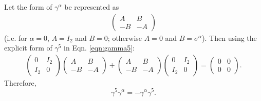 \label{ssc:gamma5Anticommutator}

Let the form of $\gamma^\alpha$ be represented as
\begin{align*}
\begin{pmatrix}
A & B\\
-B & -A
\end{pmatrix}
\end{align*}
(i.e. for $\alpha=0$, $A=I_2$ and $B=0$; otherwise $A=0$ and $B=\sigma^\alpha$).
Then using the
explicit form of $\gamma^5$ in Eqn. \ref{eqn:gamma5}:
\begin{align*}
\begin{pmatrix}
0 & I_2\\
I_2 & 0
\end{pmatrix}
\begin{pmatrix}
A & B\\
-B & -A
\end{pmatrix}
+
\begin{pmatrix}
A & B\\
-B & -A
\end{pmatrix}
\begin{pmatrix}
0 & I_2\\
I_2 & 0
\end{pmatrix}
=
\begin{pmatrix}
0 & 0\\
0 & 0
\end{pmatrix}
.
\end{align*}
Therefore, 
\begin{equation}\label{eqn:gamma5Anticommutator}
\gamma^5 \gamma^\alpha=-\gamma^\alpha \gamma^5.
\end{equation}

\label{ssc:gammaOdd=0}

